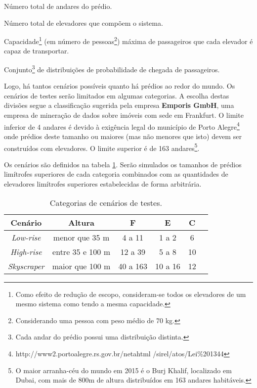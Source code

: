 \begin{description}[leftmargin=!,labelwidth=\widthof{\bfseries F}]
  \item[F]
  Número total de andares do prédio.
  \item[E]
  Número total de elevadores que compõem o sistema.
  \item[C]
  Capacidade\footnote{Como efeito de redução de escopo, consideram-se todos os
  elevadores de um mesmo sistema como tendo a mesma capacidade.} (em número de
  pessoas\footnote{Considerando uma pessoa com peso médio de 70 kg.}) máxima de
  passageiros que cada elevador é capaz de transportar.
  \item[D]
  Conjunto\footnote{Cada andar do prédio possui uma distribuição distinta.} de distribuições de probabilidade de chegada de passageiros.
\end{description}

Logo, há tantos cenários possíveis quanto há prédios ao redor do mundo. Os
cenários de testes serão limitados em algumas categorias. A escolha destas
divisões segue a classificação \cite{Emporis15} sugerida pela empresa
\textbf{Emporis GmbH}, uma empresa de mineração de dados sobre imóveis com sede
em Frankfurt. O limite inferior de 4 andares é devido à exigência legal do
município de Porto Alegre\footnote{http://www2.portoalegre.rs.gov.br/netahtml
/sirel/atos/Lei\%201344} onde prédios deste tamanho ou maiores (mas não menores
que isto) devem ser construídos com elevadores. O limite superior é de 163
andares\footnote{O maior arranha-céu do mundo em 2015 é o Burj Khalif,
localizado em Dubai, com mais de 800m de altura distribuídos em 163 andares
habitáveis.}.

Os cenários são definidos na tabela \ref{tab:cenarios}. Serão simulados os
tamanhos de prédios limítrofes superiores de cada categoria combinados com as
quantidades de elevadores limítrofes superiores estabelecidas de forma
arbitrária.

\begin{table}[htb!]
\centering
\caption{Categorias de cenários de testes.}
\label{tab:cenarios}
\begin{tabular}{|c|c|c|c|c|c|}
\hline
{\bf Cenário} & {\bf Altura} & {\bf F}  & {\bf E} & {\bf C}
\\ \hline
{\it Low-rise}   & menor que 35 m    & 4 a 11         & 1 a 2   & 6  \\ \hline
{\it High-rise}  & entre 35 e 100 m  & 12 a 39        & 5 a 8   & 10 \\ \hline
{\it Skyscraper} & maior que 100 m   & 40 a 163       & 10 a 16 & 12 \\ \hline
\end{tabular}
\end{table}

